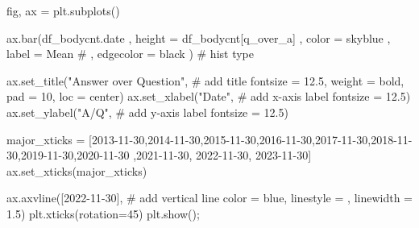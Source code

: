\documentclass[
  letterpaper,
  DIV=11,
  numbers=noendperiod]{scrartcl}
\newenvironment{Shaded}{\begin{snugshade}}{\end{snugshade}}
\newcommand{\CommentTok}[1]{\textcolor[rgb]{0.37,0.37,0.37}{#1}}
\newcommand{\DecValTok}[1]{\textcolor[rgb]{0.68,0.00,0.00}{#1}}
\newcommand{\FloatTok}[1]{\textcolor[rgb]{0.68,0.00,0.00}{#1}}
\newcommand{\NormalTok}[1]{\textcolor[rgb]{0.00,0.23,0.31}{#1}}
\newcommand{\OperatorTok}[1]{\textcolor[rgb]{0.37,0.37,0.37}{#1}}
\newcommand{\StringTok}[1]{\textcolor[rgb]{0.13,0.47,0.30}{#1}}
\begin{document}
\begin{Shaded}
\begin{Highlighting}[]
\NormalTok{fig, ax }\OperatorTok{=}\NormalTok{ plt.subplots()}


\NormalTok{ax.bar(df\_bodycnt.date}
\NormalTok{    ,  height }\OperatorTok{=}\NormalTok{ df\_bodycnt[}\StringTok{\textquotesingle{}q\_over\_a\textquotesingle{}}\NormalTok{]}
\NormalTok{    ,  color }\OperatorTok{=} \StringTok{\textquotesingle{}skyblue\textquotesingle{}}
\NormalTok{    ,  label }\OperatorTok{=} \StringTok{\textquotesingle{}Mean\textquotesingle{}}
    \CommentTok{\# ,  edgecolor = \textquotesingle{}black\textquotesingle{}}
\NormalTok{      ) }\CommentTok{\# hist type}

\NormalTok{ax.set\_title(}\StringTok{"Answer over Question"}\NormalTok{, }\CommentTok{\# add title}
\NormalTok{             fontsize }\OperatorTok{=} \FloatTok{12.5}\NormalTok{,}
\NormalTok{             weight }\OperatorTok{=} \StringTok{\textquotesingle{}bold\textquotesingle{}}\NormalTok{,}
\NormalTok{             pad }\OperatorTok{=} \DecValTok{10}\NormalTok{,}
\NormalTok{             loc }\OperatorTok{=} \StringTok{\textquotesingle{}center\textquotesingle{}}\NormalTok{)}
\NormalTok{ax.set\_xlabel(}\StringTok{"Date"}\NormalTok{, }\CommentTok{\# add x{-}axis label}
\NormalTok{              fontsize }\OperatorTok{=} \FloatTok{12.5}\NormalTok{)}
\NormalTok{ax.set\_ylabel(}\StringTok{"A/Q"}\NormalTok{, }\CommentTok{\# add y{-}axis label}
\NormalTok{              fontsize }\OperatorTok{=} \FloatTok{12.5}\NormalTok{)}

\NormalTok{major\_xticks }\OperatorTok{=}\NormalTok{ [}\StringTok{\textquotesingle{}2013{-}11{-}30\textquotesingle{}}\NormalTok{,}\StringTok{\textquotesingle{}2014{-}11{-}30\textquotesingle{}}\NormalTok{,}\StringTok{\textquotesingle{}2015{-}11{-}30\textquotesingle{}}\NormalTok{,}\StringTok{\textquotesingle{}2016{-}11{-}30\textquotesingle{}}\NormalTok{,}\StringTok{\textquotesingle{}2017{-}11{-}30\textquotesingle{}}\NormalTok{,}\StringTok{\textquotesingle{}2018{-}11{-}30\textquotesingle{}}\NormalTok{,}\StringTok{\textquotesingle{}2019{-}11{-}30\textquotesingle{}}\NormalTok{,}\StringTok{\textquotesingle{}2020{-}11{-}30\textquotesingle{}}
\NormalTok{                ,}\StringTok{\textquotesingle{}2021{-}11{-}30\textquotesingle{}}\NormalTok{, }\StringTok{\textquotesingle{}2022{-}11{-}30\textquotesingle{}}\NormalTok{, }\StringTok{\textquotesingle{}2023{-}11{-}30\textquotesingle{}}\NormalTok{]}
\NormalTok{ax.set\_xticks(major\_xticks)}

\NormalTok{ax.axvline([}\StringTok{\textquotesingle{}2022{-}11{-}30\textquotesingle{}}\NormalTok{], }\CommentTok{\# add vertical line}
\NormalTok{           color }\OperatorTok{=} \StringTok{\textquotesingle{}blue\textquotesingle{}}\NormalTok{,}
\NormalTok{           linestyle }\OperatorTok{=} \StringTok{\textquotesingle{}{-}{-}\textquotesingle{}}\NormalTok{,}
\NormalTok{           linewidth }\OperatorTok{=} \FloatTok{1.5}\NormalTok{)}
\NormalTok{plt.xticks(rotation}\OperatorTok{=}\DecValTok{45}\NormalTok{)}
\NormalTok{plt.show()}\OperatorTok{;}

\end{Highlighting}
\end{Shaded}
\end{document}
